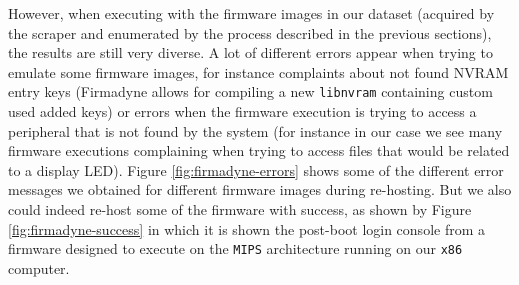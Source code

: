 However, when executing with the firmware images in our dataset (acquired by the scraper and enumerated by the process described in the previous sections), the results are still very diverse. A lot of different errors appear when trying to emulate some firmware images, for instance complaints about not found NVRAM entry keys (Firmadyne allows for compiling a new {\tt libnvram} containing custom used added keys) or errors when the firmware execution is trying to access a peripheral that is not found by the system (for instance in our case we see many firmware executions complaining when trying to access files that would be related to a display LED). Figure \ref{fig:firmadyne-errors} shows some of the different error messages we obtained for different firmware images during re-hosting. But we also could indeed re-host some of the firmware with success, as shown by Figure \ref{fig:firmadyne-success} in which it is shown the post-boot login console from a firmware designed to execute on the {\tt MIPS} architecture running on our {\tt x86} computer.

